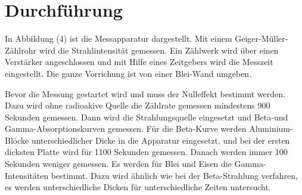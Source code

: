 \section{Durchführung}
\label{sec:Durchführung}

In Abbildung (4) ist die Messapparatur dargestellt.
Mit einem Geiger-Müller-Zählrohr wird die Strahlintensität gemessen.
Ein Zählwerk wird über einen Verstärker angeschlossen und mit Hilfe eines Zeitgebers wird die Messzeit eingestellt.
Die ganze Vorrichung ist von einer Blei-Wand umgeben. 

Bevor die Messung gestartet wird und muss der Nulleffekt bestimmt werden. Dazu wird ohne radioakive Quelle die Zählrate gemessen mindestens 900 Sekunden gemessen.
Dann wird die Strahlungsquelle eingesetzt und Beta-und Gamma-Absorptionskurven gemessen.
Für die Beta-Kurve werden Aluminium-Blöcke unterschiedlicher Dicke in die Apparatur eingesetzt, und bei der ersten dicksten Platte wird für 1100 Sekunden gemessen.
Danach werden immer 100 Sekunden weniger gemessen.
Es werden für Blei und Eisen die  Gamma-Intensitäten bestimmt. Dazu wird ähnlich wie bei der Beta-Strahlung verfahren, es werden unterschiedliche Dicken für unterschiedliche Zeiten untersucht.

